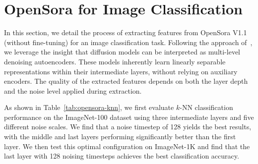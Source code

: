 \section{OpenSora for Image Classification}

In this section, we detail the process of extracting features from OpenSora V1.1~\cite{opensora} (without fine-tuning) for an image classification task. Following the approach of~\cite{xiang2023denoising}, we leverage the insight that diffusion models can be interpreted as multi-level denoising autoencoders. These models inherently learn linearly separable representations within their intermediate layers, without relying on auxiliary encoders. The quality of the extracted features depends on both the layer depth and the noise level applied during extraction.


\begin{table}[h]
\centering
\caption{$k$-NN evaluation results of OpenSora V1.1 features from different layer depths and noising scales on ImageNet-100. Top1 and Top5 accuracy (\%) are reported.}
\label{tab:opensora-knn}
\end{table}

As shown in Table~\ref{tab:opensora-knn}, we first evaluate $k$-NN classification performance on the ImageNet-100 dataset using three intermediate layers and five different noise scales. We find that a noise timestep of 128 yields the best results, with the middle and last layers performing significantly better than the first layer.
We then test this optimal configuration on ImageNet-1K and find that the last layer with 128 noising timesteps achieves the best classification accuracy.

